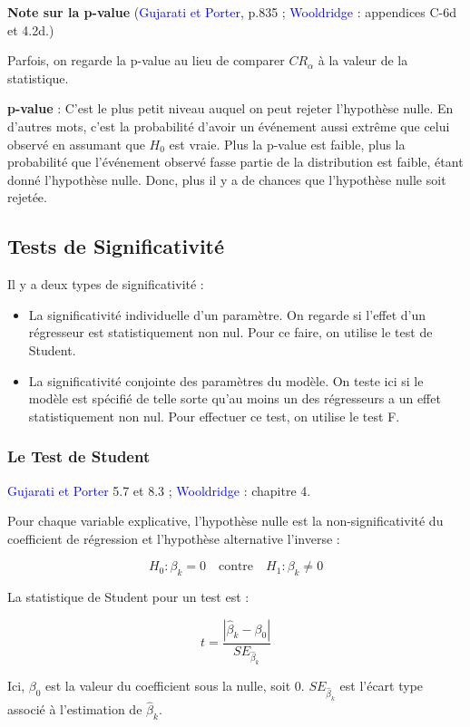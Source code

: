 \documentclass[14pt]{extarticle} %
\theoremstyle{definition}
\theoremstyle{plain}
\newcommand{\livre}[1]{\textcolor{blue}{#1}}
\begin{document}
\textbf{Note sur la p-value} (\livre{Gujarati et Porter}, p.835 ; \livre{Wooldridge} : appendices C-6d et 4.2d.)

Parfois, on regarde la p-value au lieu de comparer $CR_\alpha$ à la valeur de la statistique.

\textbf{p-value} : C’est le plus petit niveau auquel on peut rejeter l’hypothèse nulle. En d’autres mots, c’est la probabilité d’avoir un événement aussi extrême que celui observé en assumant que $H_0$ est vraie. Plus la p-value est faible, plus la probabilité que l’événement observé fasse partie de la distribution est faible, étant donné l’hypothèse nulle. Donc, plus il y a de chances que l’hypothèse nulle soit rejetée.

\subsection{Tests de Significativité}

Il y a deux types de significativité :

\begin{itemize}
    \item La significativité individuelle d’un paramètre. On regarde si l’effet d’un régresseur est statistiquement non nul. Pour ce faire, on utilise le test de Student.
    \item La significativité conjointe des paramètres du modèle. On teste ici si le modèle est spécifié de telle sorte qu’au moins un des régresseurs a un effet statistiquement non nul. Pour effectuer ce test, on utilise le test F.
\end{itemize}

\subsubsection{Le Test de Student}

\livre{Gujarati et Porter} 5.7 et 8.3 ; \livre{Wooldridge} : chapitre 4.

Pour chaque variable explicative, l’hypothèse nulle est la non-significativité du coefficient de régression et l’hypothèse alternative l’inverse :

\[
H_0 : \beta_k = 0 \quad \text{contre} \quad H_1 : \beta_k \neq 0
\]

La statistique de Student pour un test est :

\[
t = \frac{|\hat{\beta}_k - \beta_0|}{SE_{\hat{\beta}_k}}
\]

Ici, $\beta_0$ est la valeur du coefficient sous la nulle, soit 0. $SE_{\hat{\beta}_k}$ est l’écart type associé à l’estimation de $\hat{\beta}_k$.
\end{document}

